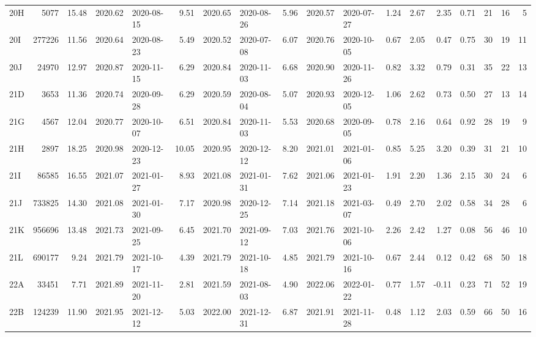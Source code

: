 \begin{tabular}{lrrrlrrlrrlrrrrrrr}
  20H &   5077 &     15.48 &     2020.62 &      2020-08-15 &     9.51 &    2020.65 &     2020-08-26 &      5.96 &     2020.57 &      2020-07-27 &        1.24 &        2.67 &        2.35 &      0.71 &       21 &      16 &        5 \\
  20I & 277226 &     11.56 &     2020.64 &      2020-08-23 &     5.49 &    2020.52 &     2020-07-08 &      6.07 &     2020.76 &      2020-10-05 &        0.67 &        2.05 &        0.47 &      0.75 &       30 &      19 &       11 \\
  20J &  24970 &     12.97 &     2020.87 &      2020-11-15 &     6.29 &    2020.84 &     2020-11-03 &      6.68 &     2020.90 &      2020-11-26 &        0.82 &        3.32 &        0.79 &      0.31 &       35 &      22 &       13 \\
  21D &   3653 &     11.36 &     2020.74 &      2020-09-28 &     6.29 &    2020.59 &     2020-08-04 &      5.07 &     2020.93 &      2020-12-05 &        1.06 &        2.62 &        0.73 &      0.50 &       27 &      13 &       14 \\
  21G &   4567 &     12.04 &     2020.77 &      2020-10-07 &     6.51 &    2020.84 &     2020-11-03 &      5.53 &     2020.68 &      2020-09-05 &        0.78 &        2.16 &        0.64 &      0.92 &       28 &      19 &        9 \\
  21H &   2897 &     18.25 &     2020.98 &      2020-12-23 &    10.05 &    2020.95 &     2020-12-12 &      8.20 &     2021.01 &      2021-01-06 &        0.85 &        5.25 &        3.20 &      0.39 &       31 &      21 &       10 \\
  21I &  86585 &     16.55 &     2021.07 &      2021-01-27 &     8.93 &    2021.08 &     2021-01-31 &      7.62 &     2021.06 &      2021-01-23 &        1.91 &        2.20 &        1.36 &      2.15 &       30 &      24 &        6 \\
  21J & 733825 &     14.30 &     2021.08 &      2021-01-30 &     7.17 &    2020.98 &     2020-12-25 &      7.14 &     2021.18 &      2021-03-07 &        0.49 &        2.70 &        2.02 &      0.58 &       34 &      28 &        6 \\
  21K & 956696 &     13.48 &     2021.73 &      2021-09-25 &     6.45 &    2021.70 &     2021-09-12 &      7.03 &     2021.76 &      2021-10-06 &        2.26 &        2.42 &        1.27 &      0.08 &       56 &      46 &       10 \\
  21L & 690177 &      9.24 &     2021.79 &      2021-10-17 &     4.39 &    2021.79 &     2021-10-18 &      4.85 &     2021.79 &      2021-10-16 &        0.67 &        2.44 &        0.12 &      0.42 &       68 &      50 &       18 \\
  22A &  33451 &      7.71 &     2021.89 &      2021-11-20 &     2.81 &    2021.59 &     2021-08-03 &      4.90 &     2022.06 &      2022-01-22 &        0.77 &        1.57 &       -0.11 &      0.23 &       71 &      52 &       19 \\
  22B & 124239 &     11.90 &     2021.95 &      2021-12-12 &     5.03 &    2022.00 &     2021-12-31 &      6.87 &     2021.91 &      2021-11-28 &        0.48 &        1.12 &        2.03 &      0.59 &       66 &      50 &       16 \\
\bottomrule
\end{tabular}
